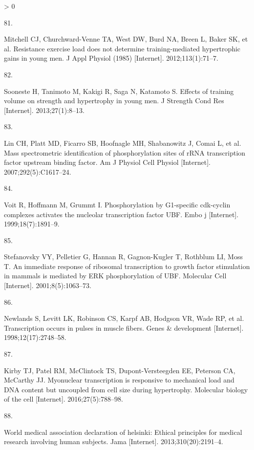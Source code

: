 \documentclass[twoside,10pt]{gihclass} %
\newlength{\cslhangindent}
\newlength{\csllabelwidth}
\newenvironment{CSLReferences}[3] %
 {%
  \setlength{\parindent}{0pt}
  \ifodd #1 \everypar{\setlength{\hangindent}{\cslhangindent}}\ignorespaces\fi
  \ifnum #2 > 0
  \setlength{\parskip}{#2\baselineskip}
  \fi
 }%
 {}
\newcommand{\CSLLeftMargin}[1]{\parbox[t]{\maxof{\widthof{#1}}{\csllabelwidth}}{#1}}
\newcommand{\CSLRightInline}[1]{\parbox[t]{\linewidth}{#1}}
\begin{document}
\begin{CSLReferences}{0}{0}
\leavevmode\hypertarget{ref-RN834}{}%
\CSLLeftMargin{81. }
\CSLRightInline{Mitchell CJ, Churchward-Venne TA, West DW, Burd NA, Breen L, Baker SK, et al. Resistance exercise load does not determine training-mediated hypertrophic gains in young men. J Appl Physiol (1985) {[}Internet{]}. 2012;113(1):71--7. }

\leavevmode\hypertarget{ref-RN1607}{}%
\CSLLeftMargin{82. }
\CSLRightInline{Sooneste H, Tanimoto M, Kakigi R, Saga N, Katamoto S. Effects of training volume on strength and hypertrophy in young men. J Strength Cond Res {[}Internet{]}. 2013;27(1):8--13. }

\leavevmode\hypertarget{ref-RN2563}{}%
\CSLLeftMargin{83. }
\CSLRightInline{Lin CH, Platt MD, Ficarro SB, Hoofnagle MH, Shabanowitz J, Comai L, et al. Mass spectrometric identification of phosphorylation sites of rRNA transcription factor upstream binding factor. Am J Physiol Cell Physiol {[}Internet{]}. 2007;292(5):C1617--24. }

\leavevmode\hypertarget{ref-RN2602}{}%
\CSLLeftMargin{84. }
\CSLRightInline{Voit R, Hoffmann M, Grummt I. Phosphorylation by G1-specific cdk-cyclin complexes activates the nucleolar transcription factor UBF. Embo j {[}Internet{]}. 1999;18(7):1891--9. }

\leavevmode\hypertarget{ref-RN2604}{}%
\CSLLeftMargin{85. }
\CSLRightInline{Stefanovsky VY, Pelletier G, Hannan R, Gagnon-Kugler T, Rothblum LI, Moss T. An immediate response of ribosomal transcription to growth factor stimulation in mammals is mediated by ERK phosphorylation of UBF. Molecular Cell {[}Internet{]}. 2001;8(5):1063--73. }

\leavevmode\hypertarget{ref-RN2618}{}%
\CSLLeftMargin{86. }
\CSLRightInline{Newlands S, Levitt LK, Robinson CS, Karpf AB, Hodgson VR, Wade RP, et al. Transcription occurs in pulses in muscle fibers. Genes \& development {[}Internet{]}. 1998;12(17):2748--58. }

\leavevmode\hypertarget{ref-RN2616}{}%
\CSLLeftMargin{87. }
\CSLRightInline{Kirby TJ, Patel RM, McClintock TS, Dupont-Versteegden EE, Peterson CA, McCarthy JJ. Myonuclear transcription is responsive to mechanical load and DNA content but uncoupled from cell size during hypertrophy. Molecular biology of the cell {[}Internet{]}. 2016;27(5):788--98. }

\leavevmode\hypertarget{ref-RN2548}{}%
\CSLLeftMargin{88. }
\CSLRightInline{World medical association declaration of helsinki: Ethical principles for medical research involving human subjects. Jama {[}Internet{]}. 2013;310(20):2191--4. }


\end{CSLReferences}
\end{document}

